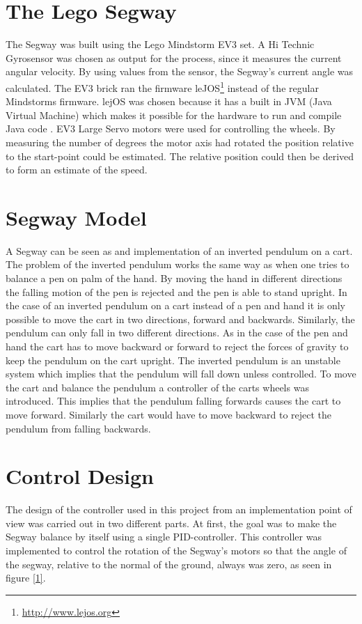 \section{The Lego Segway}
The Segway was built using the Lego Mindstorm EV3 set. A Hi Technic Gyrosensor was chosen as output for the process, since it measures the current angular velocity. By using values from the sensor, the Segway's current angle was calculated. The EV3 brick ran the firmware leJOS\footnote{\url{http://www.lejos.org}} instead of the regular Mindstorms firmware. lejOS was chosen because it has a built in JVM (Java Virtual Machine) which makes it possible for the hardware to run and compile Java code \cite{JVM}. EV3 Large Servo motors were used for controlling the wheels. By measuring the number of degrees the motor axis had rotated the position relative to the start-point could be estimated. The relative position could then be derived to form an estimate of the speed. 

\section{Segway Model}
A Segway can be seen as and implementation of an inverted pendulum on a cart. The problem of the inverted pendulum works the same way as when one tries to balance a pen on palm of the hand. By moving the hand in different directions the falling motion of the pen is rejected and the pen is able to stand upright. In the case of an inverted pendulum on a cart instead of a pen and hand it is only possible to move the cart in two directions, forward and backwards. Similarly, the pendulum can only fall in two different directions. As in the case of the pen and hand the cart has to move backward or forward to reject the forces of gravity to keep the pendulum on the cart upright. The inverted pendulum is an unstable system which implies that the pendulum  will fall down unless controlled. To move the cart and balance the pendulum a controller of the carts wheels was introduced. This implies that the pendulum falling forwards causes the cart to move forward. Similarly the cart would have to move backward to reject the pendulum from falling backwards.


\section{Control Design}
The design of the controller used in this project from an implementation point of view was carried out in two different parts. 
At first, the goal was to make the Segway balance by itself using a single PID-controller. This controller was implemented to control the rotation of the Segway's motors so that the angle of the segway, relative to the normal of the ground, always was zero, as seen in figure \ref{1}.



